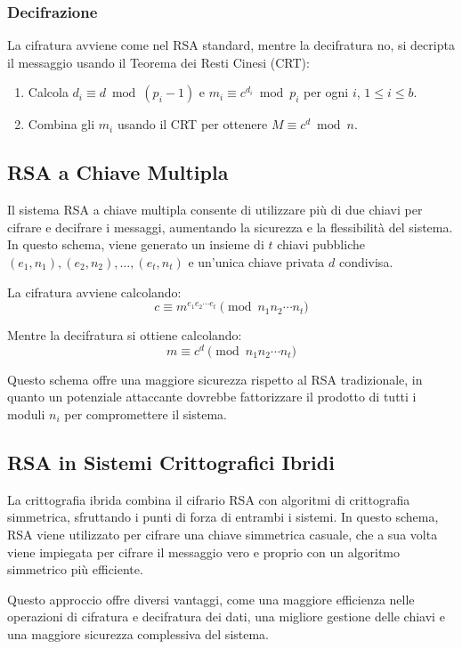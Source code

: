 \documentclass[a4paper,12pt]{report}
\begin{document}
\subsubsection*{Decifrazione}
La cifratura avviene come nel RSA standard, mentre la decifratura no, si decripta il messaggio usando il Teorema dei Resti Cinesi (CRT):
\begin{enumerate}
\item Calcola $d_i \equiv d \bmod (p_i - 1)$ e $m_i \equiv c^{d_i} \bmod p_i$ per ogni $i$, $1 \leq i \leq b$.
\item Combina gli $m_i$ usando il CRT per ottenere $M \equiv c^d \bmod n$.
\end{enumerate}

\subsection{RSA a Chiave Multipla}
Il sistema RSA a chiave multipla consente di utilizzare più di due chiavi per cifrare e decifrare i messaggi, aumentando la sicurezza e la flessibilità del sistema. In questo schema, viene generato un insieme di $t$ chiavi pubbliche $(e_1, n_1), (e_2, n_2), \ldots, (e_t, n_t)$ e un'unica chiave privata $d$ condivisa.

La cifratura avviene calcolando:
\[c \equiv m^{e_1 e_2 \cdots e_t} \pmod{n_1 n_2 \cdots n_t}\]

Mentre la decifratura si ottiene calcolando:
\[m \equiv c^d \pmod{n_1 n_2 \cdots n_t}\]

Questo schema offre una maggiore sicurezza rispetto al RSA tradizionale, in quanto un potenziale attaccante dovrebbe fattorizzare il prodotto di tutti i moduli $n_i$ per compromettere il sistema.

\subsection{RSA in Sistemi Crittografici Ibridi}
La crittografia ibrida combina il cifrario RSA con algoritmi di crittografia simmetrica, sfruttando i punti di forza di entrambi i sistemi. In questo schema, RSA viene utilizzato per cifrare una chiave simmetrica casuale, che a sua volta viene impiegata per cifrare il messaggio vero e proprio con un algoritmo simmetrico più efficiente.

Questo approccio offre diversi vantaggi, come una maggiore efficienza nelle operazioni di cifratura e decifratura dei dati, una migliore gestione delle chiavi e una maggiore sicurezza complessiva del sistema. 
\end{document}
